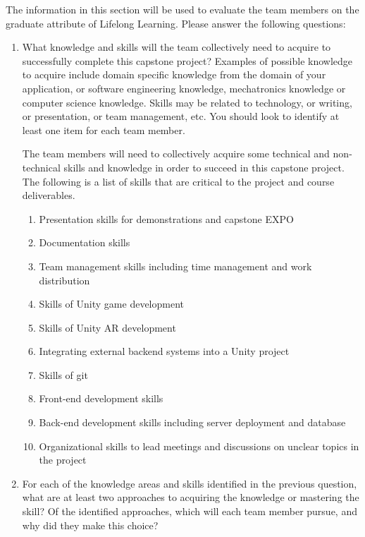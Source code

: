 \documentclass[12pt]{article}
\begin{document}
The information in this section will be used to evaluate the team members on the
graduate attribute of Lifelong Learning.  Please answer the following questions:

\begin{enumerate}
  \item What knowledge and skills will the team collectively need to acquire to
  successfully complete this capstone project?  Examples of possible knowledge
  to acquire include domain specific knowledge from the domain of your
  application, or software engineering knowledge, mechatronics knowledge or
  computer science knowledge.  Skills may be related to technology, or writing,
  or presentation, or team management, etc.  You should look to identify at
  least one item for each team member.
  
  
\quad The team members will need to collectively acquire some technical and non-technical skills and knowledge in order to succeed in this capstone project. The following is a list of skills that are critical to the project and course deliverables.
  \begin{enumerate}[1]
      \item Presentation skills for demonstrations and capstone EXPO
      \item Documentation skills
      \item Team management skills including time management and work distribution
      \item Skills of Unity game development
      \item Skills of Unity AR development
      \item Integrating external backend systems into a Unity project
      \item Skills of git
      \item Front-end development skills
      \item Back-end development skills including server deployment and database
      \item Organizational skills to lead meetings and discussions on unclear topics in the project
  \end{enumerate}
  
  \item For each of the knowledge areas and skills identified in the previous
  question, what are at least two approaches to acquiring the knowledge or
  mastering the skill?  Of the identified approaches, which will each team
  member pursue, and why did they make this choice?
  

\end{enumerate}
\end{document}
